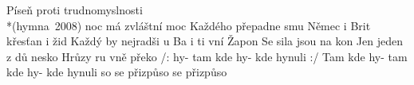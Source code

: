 \begin{TEXT}{Píseň proti trudnomyslnosti\\*(hymna~2008)}
\SLOKA* {} noc má zvláštní moc \NL
Každého přepadne smu \NL
Němec i Brit křesťan i žid \NL
Každý by nejradši u \NL
Ba i ti vní Žapon \NL
Se sila jsou na kon \NL
Jen jeden z dů nesko \NL
Hrůzy ru vně překo 
\SLOKA* /:  hy- tam kde hy- kde hynuli  :/ \NL
Tam kde hy- tam kde hy- kde hynuli so \NL
{} se přizpůso  se přizpůso  \NL
\end{TEXT}
